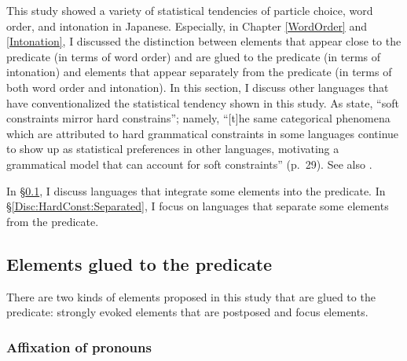 This study showed a variety of statistical tendencies of particle choice, word order, and intonation in Japanese.
Especially, in Chapter \ref{WordOrder} and \ref{Intonation},
I discussed the distinction between
elements that appear close to the predicate (in terms of word order) and are glued to the predicate (in terms of intonation) and
elements that appear separately from the predicate (in terms of both word order and intonation).
In this section,
I discuss other languages that have conventionalized the statistical tendency shown in this study.
As  state,
``soft constraints mirror hard constrains'';
namely, ``[t]he same categorical phenomena which are attributed to hard grammatical constraints in some languages continue to show up as statistical preferences in other languages,
motivating a grammatical model that can account for soft constraints'' (p.~29).
See also \cite{givon79,bybeehopper01}.

In \S \ref{Disc:HardConst:Integrated},
I discuss languages that
integrate some elements into the predicate.
In \S \ref{Disc:HardConst:Separated},
I focus on languages that
separate some elements from the predicate.

\subsection{Elements glued to the predicate}\label{Disc:HardConst:Integrated}

There are two kinds of elements proposed in this study
that are glued to the predicate:
strongly evoked elements that are postposed and
focus elements.

\subsubsection{Affixation of pronouns}

